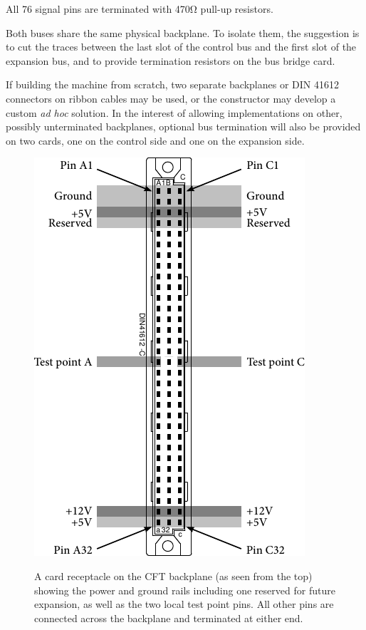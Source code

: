 \documentclass[11pt,a4paper,twocolumns]{article}
\begin{document}
All 76 signal pins are terminated with 470Ω pull-up resistors.

Both buses share the same physical backplane. To isolate them, the
suggestion is to cut the traces between the last slot of the control
bus and the first slot of the expansion bus, and to provide
termination resistors on the bus bridge card.

If building the machine from scratch, two separate backplanes or DIN
41612 connectors on ribbon cables may be used, or the constructor may
develop a custom {\em ad hoc\/} solution. In the interest of allowing
implementations on other, possibly unterminated backplanes, optional
bus termination will also be provided on two cards, one on the control
side and one on the expansion side.

\begin{figure}[t]
\centering
\includegraphics{figs/din41612.pdf}\\
\caption{\label{fig-slot}A card receptacle on the CFT backplane (as
  seen from the top) showing the power and ground rails including one
  reserved for future expansion, as well as the two local test point
  pins. All other pins are connected across the backplane and
  terminated at either end.  }
\end{figure}
\end{document}
